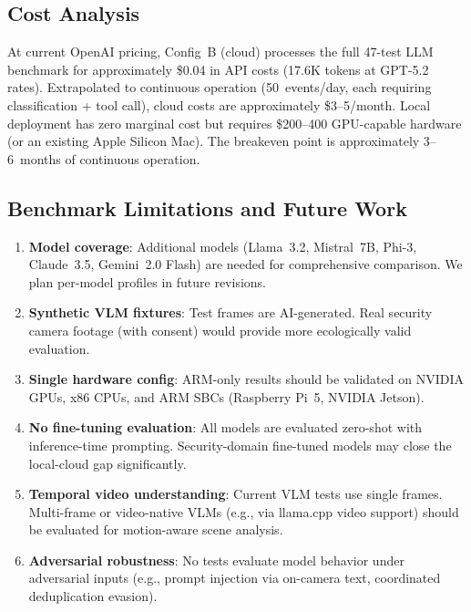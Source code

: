 \documentclass[conference]{IEEEtran}
\begin{document}
\subsection{Cost Analysis}

At current OpenAI pricing, Config~B (cloud) processes the full 47-test
LLM benchmark for approximately \$0.04 in API costs (17.6K tokens at
GPT-5.2 rates). Extrapolated to continuous operation (50~events/day,
each requiring classification + tool call), cloud costs are approximately
\$3--5/month. Local deployment has zero marginal cost but requires
\$200--400 GPU-capable hardware (or an existing Apple Silicon Mac).
The breakeven point is approximately 3--6~months of continuous operation.

\subsection{Benchmark Limitations and Future Work}

\begin{enumerate}[nosep]
    \item \textbf{Model coverage}: Additional models (Llama~3.2,
    Mistral~7B, Phi-3, Claude~3.5, Gemini~2.0 Flash) are needed for
    comprehensive comparison. We plan per-model profiles in future
    revisions.
    \item \textbf{Synthetic VLM fixtures}: Test frames are AI-generated.
    Real security camera footage (with consent) would provide more
    ecologically valid evaluation.
    \item \textbf{Single hardware config}: ARM-only results should be
    validated on NVIDIA GPUs, x86 CPUs, and ARM SBCs (Raspberry Pi~5,
    NVIDIA Jetson).
    \item \textbf{No fine-tuning evaluation}: All models are evaluated
    zero-shot with inference-time prompting. Security-domain fine-tuned
    models may close the local-cloud gap significantly.
    \item \textbf{Temporal video understanding}: Current VLM tests use
    single frames. Multi-frame or video-native VLMs (e.g., via
    llama.cpp video support) should be evaluated for motion-aware scene
    analysis.
    \item \textbf{Adversarial robustness}: No tests evaluate model
    behavior under adversarial inputs (e.g., prompt injection via
    on-camera text, coordinated deduplication evasion).
\end{enumerate}

\end{document}
